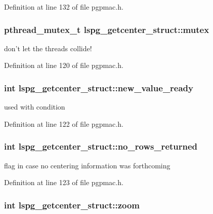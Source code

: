 Definition at line 132 of file pgpmac.h.\hypertarget{structlspg__getcenter__struct_a214bb7e88b137162f13f41f2c43002a9}{
\subsubsection[{mutex}]{\setlength{\rightskip}{0pt plus 5cm}pthread\_\-mutex\_\-t {\bf lspg\_\-getcenter\_\-struct::mutex}}}
\label{structlspg__getcenter__struct_a214bb7e88b137162f13f41f2c43002a9}


don't let the threads collide! 

Definition at line 120 of file pgpmac.h.\hypertarget{structlspg__getcenter__struct_a4b350f11f1e375b9e9e839caaffbcb6b}{
\subsubsection[{new\_\-value\_\-ready}]{\setlength{\rightskip}{0pt plus 5cm}int {\bf lspg\_\-getcenter\_\-struct::new\_\-value\_\-ready}}}
\label{structlspg__getcenter__struct_a4b350f11f1e375b9e9e839caaffbcb6b}


used with condition 

Definition at line 122 of file pgpmac.h.\hypertarget{structlspg__getcenter__struct_aaeb0ccf4289b4fb306c2bc04ae85b237}{
\subsubsection[{no\_\-rows\_\-returned}]{\setlength{\rightskip}{0pt plus 5cm}int {\bf lspg\_\-getcenter\_\-struct::no\_\-rows\_\-returned}}}
\label{structlspg__getcenter__struct_aaeb0ccf4289b4fb306c2bc04ae85b237}


flag in case no centering information was forthcoming 

Definition at line 123 of file pgpmac.h.\hypertarget{structlspg__getcenter__struct_a63e640a925611d2404a1529aea30a853}{
\subsubsection[{zoom}]{\setlength{\rightskip}{0pt plus 5cm}int {\bf lspg\_\-getcenter\_\-struct::zoom}}}
\label{structlspg__getcenter__struct_a63e640a925611d2404a1529aea30a853}


